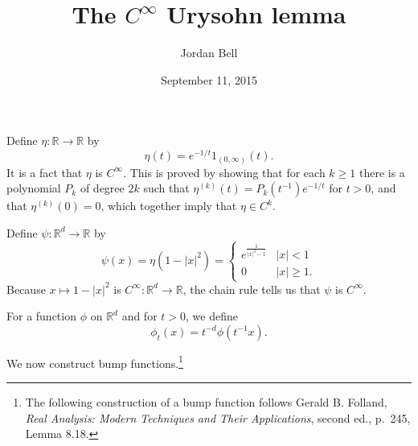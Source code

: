 \documentclass{article}
\theoremstyle{definition}
\begin{document}
\title{The $C^\infty$ Urysohn lemma}
\author{Jordan Bell}
\date{September 11, 2015}

\maketitle

Define $\eta:\mathbb{R} \to \mathbb{R}$ by
\[
\eta(t) = e^{-1/t} 1_{(0,\infty)}(t).
\]
It is a fact that $\eta$ is $C^\infty$. This is proved by showing that for each $k \geq 1$ there is a polynomial $P_k$ of degree $2k$ such that $\eta^{(k)}(t)=P_k(t^{-1}) e^{-1/t}$ for
$t>0$, and that $\eta^{(k)}(0)=0$, which together imply that $\eta \in C^k$.


Define $\psi:\mathbb{R}^d \to \mathbb{R}$ by
\[
\psi(x) = \eta(1-|x|^2) = \begin{cases}
e^{\frac{1}{|x|^2-1}}&|x|<1\\
0&|x| \geq 1.
\end{cases}
\]
Because $x \mapsto 1-|x|^2$ is $C^\infty:\mathbb{R}^d \to \mathbb{R}$,  the chain rule tells us that
$\psi$ is $C^\infty$. 

For a function $\phi$ on $\mathbb{R}^d$ and for $t>0$, we define
\[
\phi_t(x) = t^{-d} \phi(t^{-1}x).
\]

We now construct bump functions.\footnote{The following construction of a bump function 
follows  Gerald B. Folland, {\em Real Analysis: Modern Techniques
and Their Applications}, second ed., p.~245, Lemma 8.18.}
\end{document}
